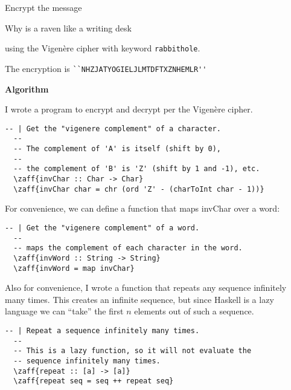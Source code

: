 \begin{problem}

Encrypt the message 
\begin{center}
\textsf{Why is a raven like a writing desk} 
\end{center}
using the Vigen\`ere cipher with keyword \texttt{rabbithole}.
\end{problem}

\begin{Answer}

The encryption is \Verb#``NHZJATYOGIELJLMTDFTXZNHEMLR''#

\bigskip
\noindent
\begin{center}\textbf{Algorithm}\end{center}

\noindent
I wrote a program to encrypt and decrypt per the Vigen\`ere cipher.

\color{crimson}
\begin{Verbatim}[commandchars=\\\{\}]
  -- | Get the "vigenere complement" of a character.
  --
  -- The complement of 'A' is itself (shift by 0),
  --
  -- the complement of 'B' is 'Z' (shift by 1 and -1), etc.
  \zaff{invChar :: Char -> Char}
  \zaff{invChar char = chr (ord 'Z' - (charToInt char - 1))}
\end{Verbatim}
\color{black}
\noindent
For convenience, we can define a function that maps invChar over a word:
\color{crimson}
\begin{Verbatim}[commandchars=\\\{\}]
  -- | Get the "vigenere complement" of a word.
  --
  -- maps the complement of each character in the word.
  \zaff{invWord :: String -> String}
  \zaff{invWord = map invChar}
\end{Verbatim}
\color{black}

\noindent
Also for convenience, I wrote a function that repeats any sequence
infinitely many times. This creates an infinite sequence,
but since Haskell is a lazy language we can ``take''
the first $n$ elements out of such a sequence.

\color{crimson}
\begin{Verbatim}[commandchars=\\\{\}]
  -- | Repeat a sequence infinitely many times.
  --
  -- This is a lazy function, so it will not evaluate the
  -- sequence infinitely many times.
  \zaff{repeat :: [a] -> [a]}
  \zaff{repeat seq = seq ++ repeat seq}
\end{Verbatim}


\end{Answer}
